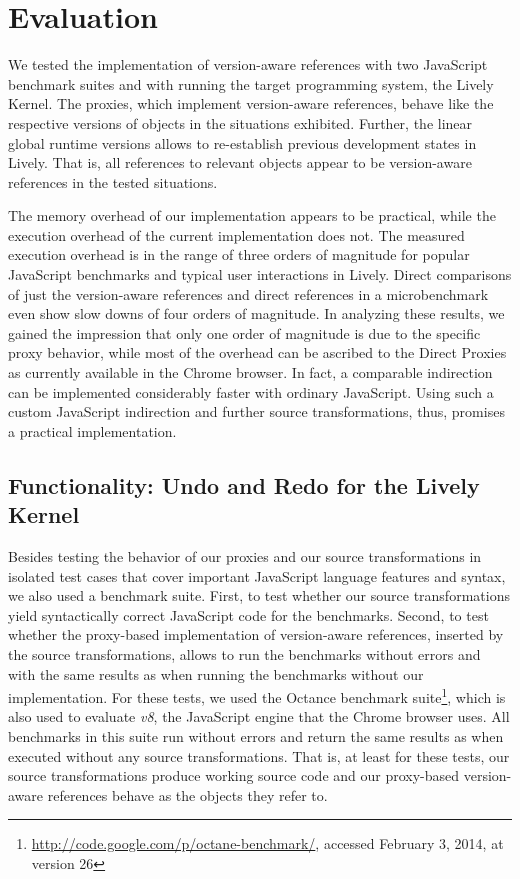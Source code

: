\chapter{Evaluation} \label{chapter:EVALUATION}

We tested the implementation of version-aware references with two JavaScript benchmark suites and with running the target programming system, the Lively Kernel.
The proxies, which implement version-aware references, behave like the respective versions of objects in the situations exhibited.
Further, the linear global runtime versions allows to re-establish previous development states in Lively.
That is, all references to relevant objects appear to be version-aware references in the tested situations.

The memory overhead of our implementation appears to be practical, while the execution overhead of the current implementation does not.
The measured execution overhead is in the range of three orders of magnitude for popular JavaScript benchmarks and typical user interactions in Lively.
Direct comparisons of just the version-aware references and direct references in a microbenchmark even show slow downs of four orders of magnitude.
In analyzing these results, we gained the impression that only one order of magnitude is due to the specific proxy behavior, while most of the overhead can be ascribed to the Direct Proxies as currently available in the Chrome browser.
In fact, a comparable indirection can be implemented considerably faster with ordinary JavaScript.
Using such a custom JavaScript indirection and further source transformations, thus, promises a practical implementation.


\section{Functionality: Undo and Redo for the Lively Kernel} \label{sec:DISCUSSION:1}


Besides testing the behavior of our proxies and our source transformations in isolated test cases that cover important JavaScript language features and syntax, we also used a benchmark suite.
First, to test whether our source transformations yield syntactically correct JavaScript code for the benchmarks.
Second, to test whether the proxy-based implementation of version-aware references, inserted by the source transformations, allows to run the benchmarks without errors and with the same results as when running the benchmarks without our implementation.
For these tests, we used the Octance benchmark suite\footnote{\url{http://code.google.com/p/octane-benchmark/}, accessed February 3, 2014, at version 26}, which is also used to evaluate \emph{v8}, the JavaScript engine that the Chrome browser uses.
All benchmarks in this suite run without errors and return the same results as when executed without any source transformations.
That is, at least for these tests, our source transformations produce working source code and our proxy-based version-aware references behave as the objects they refer to.

